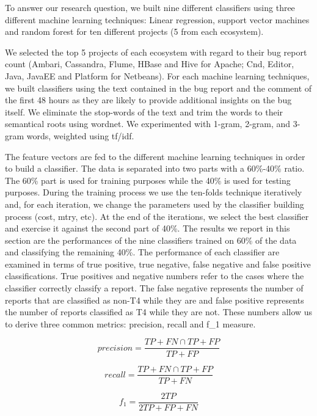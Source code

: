 \documentclass[12pt]{report}
\begin{document}
To answer our research question, we built nine different classifiers
using three different machine learning techniques: Linear regression,
support vector machines and random forest for ten different projects (5
from each ecosystem).

We selected the top 5 projects of each ecosystem with regard to their
bug report count (Ambari, Cassandra, Flume, HBase and Hive for Apache;
Cnd, Editor, Java, JavaEE and Platform for Netbeans). For each machine
learning techniques, we built classifiers using the text contained in
the bug report and the comment of the first 48 hours as they are likely
to provide additional insights on the bug itself. We eliminate the
stop-words of the text and trim the words to their semantical roots
using wordnet. We experimented with 1-gram, 2-gram, and 3-gram words,
weighted using tf/idf.

The feature vectors are fed to the different machine learning techniques
in order to build a classifier. The data is separated into two parts
with a 60\%-40\% ratio. The 60\% part is used for training purposes
while the 40\% is used for testing purposes. During the training process
we use the ten-folds technique iteratively and, for each iteration, we
change the parameters used by the classifier building process (cost,
mtry, etc). At the end of the iterations, we select the best classifier
and exercise it against the second part of 40\%. The results we report
in this section are the performances of the nine classifiers trained on
60\% of the data and classifying the remaining 40\%. The performance of
each classifier are examined in terms of true positive, true negative,
false negative and false positive classifications. True positives and
negative numbers refer to the cases where the classifier correctly
classify a report. The false negative represents the number of reports
that are classified as non-T4 while they are and false positive
represents the number of reports classified as T4 while they are not.
These numbers allow us to derive three common metrics: precision, recall
and f\_1 measure.

\begin{equation}
precision = \frac{TP+FN \cap TP+FP}{TP+FP}
\end{equation}

\begin{equation}
recall = \frac{TP+FN \cap TP+FP}{TP+FN}
\end{equation}

\begin{equation}
f_1 = \frac{2TP}{2TP + FP + FN}
\end{equation}
\end{document}
